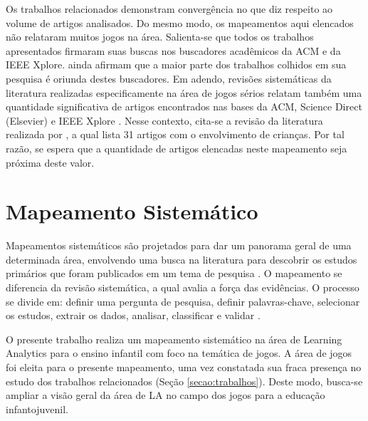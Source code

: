 \documentclass[12pt]{article}
\begin{document}
\vspace{-0.1cm}

Os trabalhos relacionados demonstram convergência no que diz respeito ao volume de artigos analisados. Do mesmo modo, os mapeamentos aqui elencados não relataram muitos jogos na área. Salienta-se que todos os trabalhos apresentados firmaram suas buscas nos buscadores acadêmicos da ACM e da IEEE Xplore.  ainda afirmam que a maior parte dos trabalhos colhidos em sua pesquisa é oriunda destes buscadores. Em adendo, revisões sistemáticas da literatura realizadas especificamente na área de jogos sérios relatam também uma quantidade significativa de artigos encontrados nas bases da ACM, Science Direct (Elsevier) e IEEE Xplore \cite{calvo2020serious}. Nesse contexto, cita-se a revisão da literatura realizada por , a qual lista 31 artigos com o envolvimento de crianças. Por tal razão, se espera que a quantidade de artigos elencadas neste mapeamento seja próxima deste valor.



\section{Mapeamento Sistemático}\label{secao:mapeamento}

Mapeamentos sistemáticos são projetados para dar um panorama geral de uma determinada área, envolvendo uma busca na literatura para descobrir os estudos primários que foram publicados em um tema de pesquisa \cite{chen2017science}. O mapeamento se diferencia da revisão sistemática, a qual avalia a força das evidências. O processo se divide em: definir uma pergunta de pesquisa, definir palavras-chave, selecionar os estudos, extrair os dados, analisar, classificar e validar \cite{khan2003five}. 

O presente trabalho realiza um mapeamento sistemático na área de Learning Analytics para o ensino infantil com foco na temática de jogos. A área de jogos foi eleita para o presente mapeamento, uma vez constatada sua fraca presença no estudo dos trabalhos relacionados (Seção \ref{secao:trabalhos}). Deste modo, busca-se ampliar a visão geral da área de LA no campo dos jogos para a educação infantojuvenil. 
\end{document}

